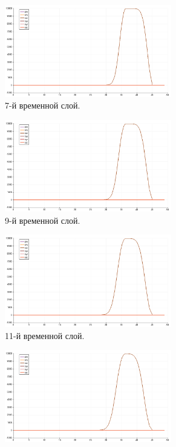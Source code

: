 \begin{figure}[htp]
\begin{subfigure}[b]{0.5\textwidth}
\includegraphics[width=0.8\textwidth]{png/s-wave-test/s/0007.png}
\caption{7-й временной слой.}
\end{subfigure}
\begin{subfigure}[b]{0.5\textwidth}
\centering
\includegraphics[width=0.8\textwidth]{png/s-wave-test/s/0009.png}
\caption{9-й временной слой.}
\end{subfigure}
\begin{subfigure}[b]{0.5\textwidth}
\centering
\includegraphics[width=0.8\textwidth]{png/s-wave-test/s/0011.png}
\caption{11-й временной слой.}
\end{subfigure}
\begin{subfigure}[b]{0.5\textwidth}
\centering
\includegraphics[width=0.8\textwidth]{png/s-wave-test/s/0013.png}

\end{subfigure}
\end{figure}
